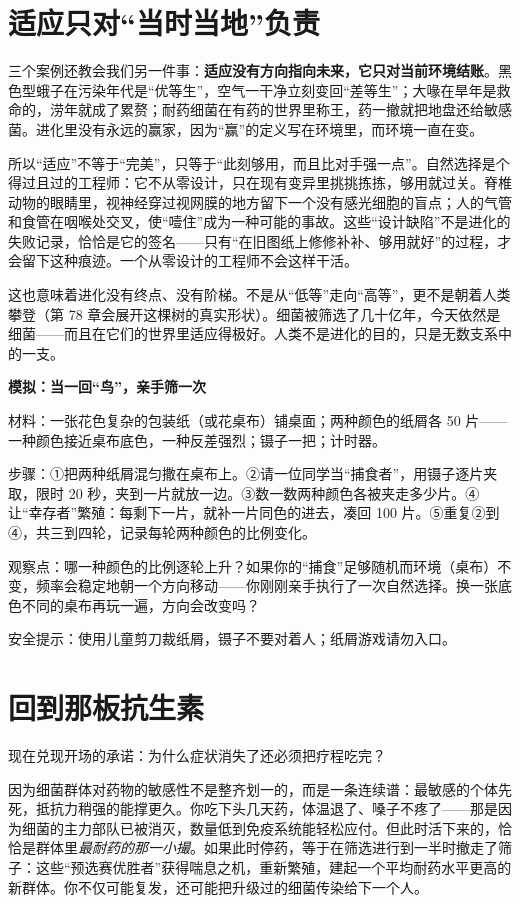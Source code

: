 \section{适应只对“当时当地”负责}

三个案例还教会我们另一件事：\textbf{适应没有方向指向未来，它只对当前环境结账}。黑色型蛾子在污染年代是“优等生”，空气一干净立刻变回“差等生”；大喙在旱年是救命的，涝年就成了累赘；耐药细菌在有药的世界里称王，药一撤就把地盘还给敏感菌。进化里没有永远的赢家，因为“赢”的定义写在环境里，而环境一直在变。

所以“适应”不等于“完美”，只等于“此刻够用，而且比对手强一点”。自然选择是个得过且过的工程师：它不从零设计，只在现有变异里挑挑拣拣，够用就过关。脊椎动物的眼睛里，视神经穿过视网膜的地方留下一个没有感光细胞的盲点；人的气管和食管在咽喉处交叉，使“噎住”成为一种可能的事故。这些“设计缺陷”不是进化的失败记录，恰恰是它的签名——只有“在旧图纸上修修补补、够用就好”的过程，才会留下这种痕迹。一个从零设计的工程师不会这样干活。

这也意味着进化没有终点、没有阶梯。不是从“低等”走向“高等”，更不是朝着人类攀登（第 78 章会展开这棵树的真实形状）。细菌被筛选了几十亿年，今天依然是细菌——而且在它们的世界里适应得极好。人类不是进化的目的，只是无数支系中的一支。

\begin{shiyan}
\textbf{模拟：当一回“鸟”，亲手筛一次}

材料：一张花色复杂的包装纸（或花桌布）铺桌面；两种颜色的纸屑各 50 片——一种颜色接近桌布底色，一种反差强烈；镊子一把；计时器。

步骤：①把两种纸屑混匀撒在桌布上。②请一位同学当“捕食者”，用镊子逐片夹取，限时 20 秒，夹到一片就放一边。③数一数两种颜色各被夹走多少片。④让“幸存者”繁殖：每剩下一片，就补一片同色的进去，凑回 100 片。⑤重复②到④，共三到四轮，记录每轮两种颜色的比例变化。

观察点：哪一种颜色的比例逐轮上升？如果你的“捕食”足够随机而环境（桌布）不变，频率会稳定地朝一个方向移动——你刚刚亲手执行了一次自然选择。换一张底色不同的桌布再玩一遍，方向会改变吗？

安全提示：使用儿童剪刀裁纸屑，镊子不要对着人；纸屑游戏请勿入口。
\end{shiyan}

\section{回到那板抗生素}

现在兑现开场的承诺：为什么症状消失了还必须把疗程吃完？

因为细菌群体对药物的敏感性不是整齐划一的，而是一条连续谱：最敏感的个体先死，抵抗力稍强的能撑更久。你吃下头几天药，体温退了、嗓子不疼了——那是因为细菌的主力部队已被消灭，数量低到免疫系统能轻松应付。但此时活下来的，恰恰是群体里\emph{最耐药的那一小撮}。如果此时停药，等于在筛选进行到一半时撤走了筛子：这些“预选赛优胜者”获得喘息之机，重新繁殖，建起一个平均耐药水平更高的新群体。你不仅可能复发，还可能把升级过的细菌传染给下一个人。

